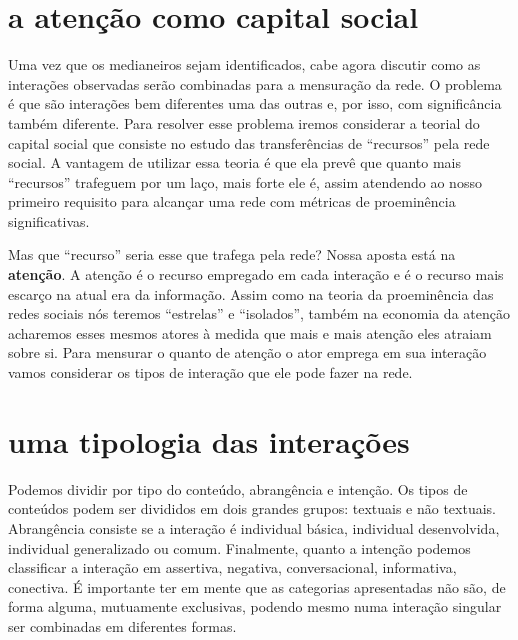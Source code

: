 \documentclass{article}
\begin{document}
\section{a atenção como capital social}

Uma vez que os medianeiros sejam identificados, cabe agora discutir como as
interações observadas serão combinadas para a mensuração da rede. O problema é
que são interações bem diferentes uma das outras e, por isso, com significância
também diferente. Para resolver esse problema iremos considerar a teorial do
capital social que consiste no estudo das transferências de ``recursos'' pela
rede social. A vantagem de utilizar essa teoria é que ela prevê que quanto mais
``recursos'' trafeguem por um laço, mais forte ele é, assim atendendo ao nosso
primeiro requisito para alcançar uma rede com métricas de proeminência
significativas.

Mas que ``recurso'' seria esse que trafega pela rede? Nossa aposta está na
\textbf{atenção}. A atenção é o recurso empregado em cada interação e é o
recurso mais escarço na atual era da informação. Assim como na teoria da
proeminência das redes sociais nós teremos ``estrelas'' e ``isolados'', também
na economia da atenção acharemos esses mesmos atores à medida que mais e mais
atenção eles atraiam sobre si. Para mensurar o quanto de atenção o ator emprega
em sua interação vamos considerar os tipos de interação que ele pode fazer na
rede.

\section{uma tipologia das interações}

Podemos dividir por tipo do conteúdo, abrangência e intenção. Os tipos de
conteúdos podem ser divididos em dois grandes grupos: textuais e não textuais.
Abrangência consiste se a interação é individual básica, individual
desenvolvida, individual generalizado ou comum. Finalmente, quanto a intenção
podemos classificar a interação em assertiva, negativa, conversacional,
informativa, conectiva. É importante ter em mente que as categorias
apresentadas não são, de forma alguma, mutuamente exclusivas, podendo mesmo numa
interação singular ser combinadas em diferentes formas.
\end{document}
